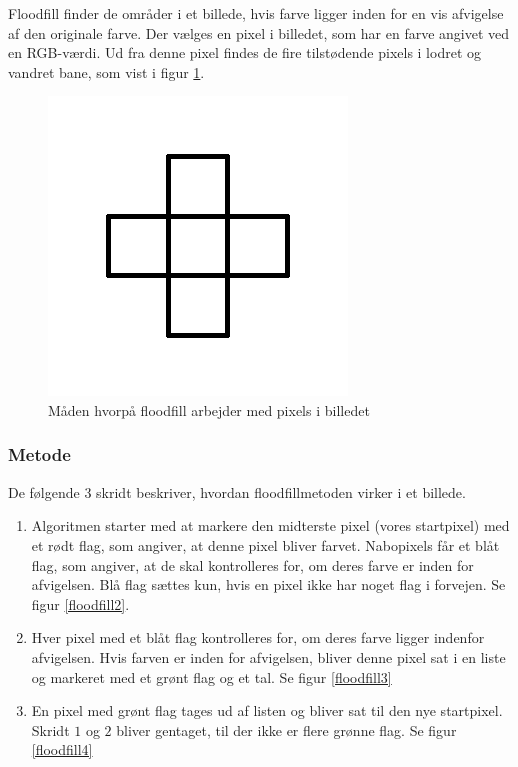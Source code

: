 {

Floodfill finder de områder i et billede, hvis farve ligger inden for en
vis afvigelse af den originale farve. Der vælges en pixel i billedet,
som har en farve angivet ved en RGB-værdi. Ud fra denne pixel findes de
fire tilstødende pixels i lodret og vandret bane, som vist i figur
\ref{floodfill1}.

\begin{figure}[!h]
    \begin{center}
        \includegraphics[scale=0.42,angle=0]{afsnit/vores_implementation/billeder/flood_fill/floodfill1}
    \end{center}
    \caption[]{Måden hvorpå floodfill arbejder med pixels i billedet}
    \label{floodfill1}
\end{figure}

\subsubsection{Metode}
De følgende 3 skridt beskriver, hvordan floodfillmetoden virker i et
billede.

\begin{enumerate}
    \item Algoritmen starter med at markere den midterste pixel (vores
        startpixel) med et rødt flag, som angiver, at denne pixel bliver
        farvet. Nabopixels får et blåt flag, som angiver, at de skal
        kontrolleres for, om deres farve er inden for afvigelsen. Blå
        flag sættes kun, hvis en pixel ikke har noget flag i forvejen.
        Se figur \ref{floodfill2}.
    \item Hver pixel med et blåt flag kontrolleres for, om deres farve
        ligger indenfor afvigelsen. Hvis farven er inden for afvigelsen,
        bliver denne pixel sat i en liste og markeret med et grønt flag
        og et tal. Se figur \ref{floodfill3}
    \item En pixel med grønt flag tages ud af listen og bliver sat til
        den nye startpixel. Skridt $1$ og $2$ bliver gentaget, til der
        ikke er flere grønne flag. Se figur \ref{floodfill4}
\end{enumerate}

}
